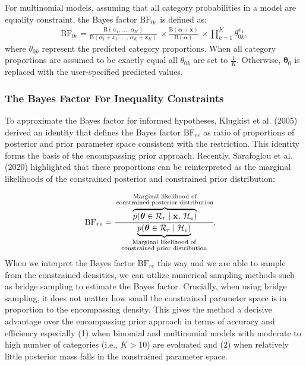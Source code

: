 \documentclass[
  english,
  man,floatsintext]{apa6}
\begin{document}
For multinomial models, assuming that all category probabilities in a model are equality constraint, the Bayes factor \(\text{BF}_{0e}\) is defined as:
\begin{align*}
\text{BF}_{0e} =  \frac{
 \text{B}\left(\alpha_{1}\text{, }\dots\text{, }\alpha_K\right)}{\text{B}\left(\alpha_1+x_1\text{, }\dots\text{, }\alpha_K+x_K\right)} \, \times 
\frac{\text{B}(\boldsymbol{\alpha}+\mathbf{x})}{\text{B}(\boldsymbol{\alpha})} \, \times  \prod_{k=1}^K \theta_{0k}^{x_k},
\end{align*}
where \(\theta_{0k}\) represent the predicted category proportions. When all category proportions are assumed to be exactly equal all \(\theta_{0k}\) are set to \(\frac{1}{K}\). Otherwise, \(\boldsymbol{\theta}_{0}\) is replaced with the user-specified predicted values.

\hypertarget{the-bayes-factor-for-inequality-constraints}{%
\subsubsection{The Bayes Factor For Inequality Constraints}\label{the-bayes-factor-for-inequality-constraints}}

\noindent To approximate the Bayes factor for informed hypotheses, Klugkist et al. (2005) derived an identity that defines the Bayes factor \(\text{BF}_{re}\) as ratio of proportions of posterior and prior parameter space consistent with the restriction. This identity forms the basis of the encompassing prior approach. Recently, Sarafoglou et al. (2020) highlighted that these proportions can be reinterpreted as the marginal likelihoods of the constrained posterior and constrained prior distribution:

\begin{align}
\label{Eq:klugkistIdentity}
\text{BF}_{re} &= \cfrac{\overbrace{p(\boldsymbol{\theta} \in \mathcal{R}_r \mid \mathbf{x}\text{, }\mathcal{H}_e)}^{\substack{\text{Marginal likelihood of}\\\text{constrained posterior distribution}}}}{\underbrace{p(\boldsymbol{\theta} \in \mathcal{R}_r \mid  \mathcal{H}_e)}_{\substack{\text{Marginal likelihood of}\\\text{constrained prior distribution}}}}.
\end{align}
When we interpret the Bayes factor \(\text{BF}_{re}\) this way and we are able to sample from the constrained densities, we can utilize numerical sampling methods such as bridge sampling to estimate the Bayes factor. Crucially, when using bridge sampling, it does not matter how small the constrained parameter space is in proportion to the encompassing density. This gives the method a decisive advantage over the encompassing prior approach in terms of accuracy and efficiency especially (1) when binomial and multinomial models with moderate to high number of categories (i.e., \(K > 10\)) are evaluated and (2) when relatively little posterior mass falls in the constrained parameter space.
\end{document}
